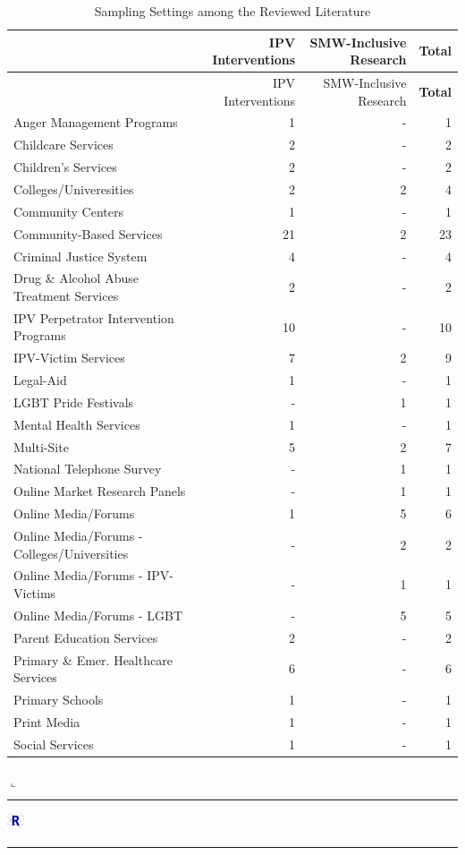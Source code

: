 \documentclass[11pt,]{tufte-book}
\newenvironment{Shaded}{}{}
\newcommand{\KeywordTok}[1]{\textcolor[rgb]{0.00,0.44,0.13}{\textbf{#1}}}
\newcommand{\DataTypeTok}[1]{\textcolor[rgb]{0.56,0.13,0.00}{#1}}
\newcommand{\DecValTok}[1]{\textcolor[rgb]{0.25,0.63,0.44}{#1}}
\newcommand{\CharTok}[1]{\textcolor[rgb]{0.25,0.44,0.63}{#1}}
\newcommand{\StringTok}[1]{\textcolor[rgb]{0.25,0.44,0.63}{#1}}
\newcommand{\OperatorTok}[1]{\textcolor[rgb]{0.40,0.40,0.40}{#1}}
\newcommand{\NormalTok}[1]{#1}
\newcommand{\Rrule}{
    \vspace*{1em}
    \noindent
    \hspace{-1em}
    \includegraphics[width=0.5cm]{auxDocs/Rlogo.png}
    \textcolor{Rblue}{
        \rule[0.1in]{0.90\linewidth}{0.02mm}
    }
    \vspace{-1.35em}
}
\newcommand{\Rerule}{
    \noindent
    \hspace{-1em}
    \textcolor{Rblue}{
        $\llcorner$\rule[-0.4mm]{\linewidth}{0.02mm}
    }
}
\begin{document}
\begin{longtable}[]{@{}lrrr@{}}
\caption{Sampling Settings among the Reviewed Literature
\label{tbl:ftmsetp}}\tabularnewline
\toprule
& IPV Interventions & SMW-Inclusive Research &
\textbf{Total}\tabularnewline
\midrule
\endfirsthead
\toprule
& IPV Interventions & SMW-Inclusive Research &
\textbf{Total}\tabularnewline
\midrule
\endhead
Anger Management Programs & 1 & - & 1\tabularnewline
Childcare Services & 2 & - & 2\tabularnewline
Children's Services & 2 & - & 2\tabularnewline
Colleges/Univeresities & 2 & 2 & 4\tabularnewline
Community Centers & 1 & - & 1\tabularnewline
Community-Based Services & 21 & 2 & 23\tabularnewline
Criminal Justice System & 4 & - & 4\tabularnewline
Drug \& Alcohol Abuse Treatment Services & 2 & - & 2\tabularnewline
IPV Perpetrator Intervention Programs & 10 & - & 10\tabularnewline
IPV-Victim Services & 7 & 2 & 9\tabularnewline
Legal-Aid & 1 & - & 1\tabularnewline
LGBT Pride Festivals & - & 1 & 1\tabularnewline
Mental Health Services & 1 & - & 1\tabularnewline
Multi-Site & 5 & 2 & 7\tabularnewline
National Telephone Survey & - & 1 & 1\tabularnewline
Online Market Research Panels & - & 1 & 1\tabularnewline
Online Media/Forums & 1 & 5 & 6\tabularnewline
Online Media/Forums - Colleges/Universities & - & 2 & 2\tabularnewline
Online Media/Forums - IPV-Victims & - & 1 & 1\tabularnewline
Online Media/Forums - LGBT & - & 5 & 5\tabularnewline
Parent Education Services & 2 & - & 2\tabularnewline
Primary \& Emer. Healthcare Services & 6 & - & 6\tabularnewline
Primary Schools & 1 & - & 1\tabularnewline
Print Media & 1 & - & 1\tabularnewline
Social Services & 1 & - & 1\tabularnewline
\bottomrule
\end{longtable}

\Rerule

\newpage

\Rrule

\begin{Shaded}
\end{Shaded}
\end{document}
